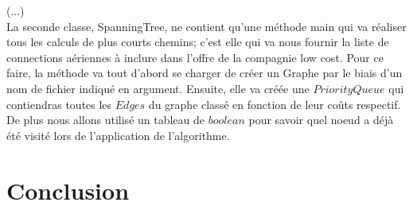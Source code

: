 \documentclass[10pt,a4paper]{article}
\begin{document}
(...)\\

La seconde classe, SpanningTree, ne contient qu'une méthode main qui va réaliser tous les calculs de plus courts chemins; c'est elle qui va nous fournir la liste de connections aériennes à inclure dans l'offre de la compagnie low cost. Pour ce faire, la méthode va tout d'abord se charger de créer un Graphe par le biais d'un nom de fichier indiqué en argument. Ensuite, elle va créée une $PriorityQueue$ qui contiendras toutes les $Edges$ du graphe classé en fonction de leur coûts respectif. De plus nous allons utilisé un tableau de $boolean$ pour savoir quel noeud a déjà été visité lors de l'application de l'algorithme. 
\section*{Conclusion}
\end{document}
